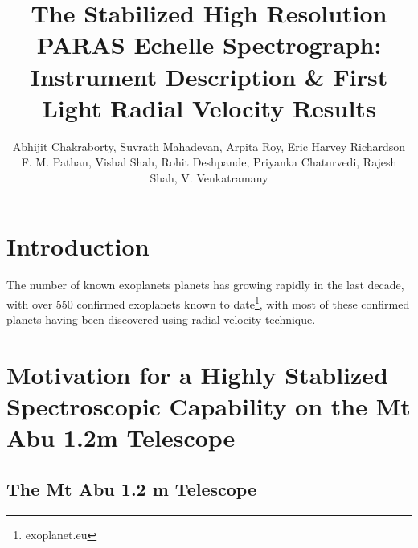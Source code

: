 \documentclass[12pt,preprint]{emulateapj}
\begin{document}
\title{The Stabilized High Resolution PARAS Echelle Spectrograph: Instrument Description \& First Light Radial Velocity Results}

\author{
  Abhijit Chakraborty,
  Suvrath Mahadevan,
  Arpita Roy,
  Eric Harvey Richardson
  F. M. Pathan,
  Vishal Shah,
  Rohit Deshpande,
  Priyanka Chaturvedi,
  Rajesh Shah,
  V. Venkatramany
}

\begin{abstract}


\end{abstract}



\section{Introduction}
\label{introduction}
\indent The number of known exoplanets planets has growing rapidly in the last decade, with over 550 confirmed exoplanets known to date\footnote{exoplanet.eu}, with most of these confirmed planets having been discovered using radial velocity technique.

\section{Motivation for a Highly Stablized  Spectroscopic Capability on the Mt Abu 1.2m Telescope}
\label{motivation}
\subsection{The Mt Abu 1.2 m Telescope}
\end{document}
